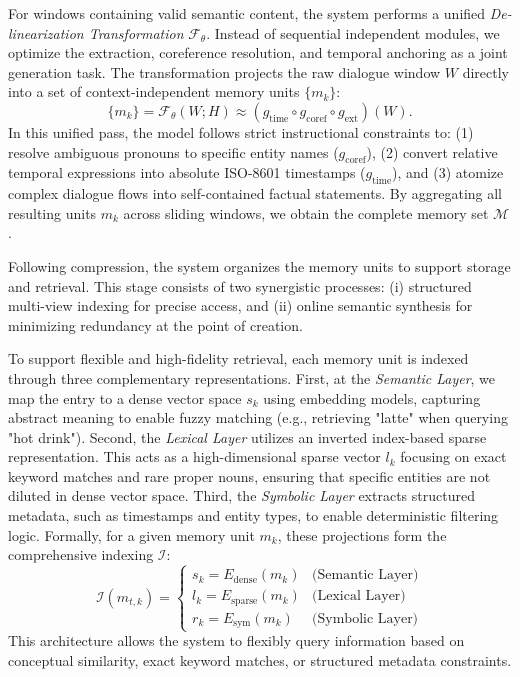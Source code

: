 \documentclass{article}
\theoremstyle{plain}
\theoremstyle{definition}
\theoremstyle{remark}
\begin{document}
For windows containing valid semantic content, the system performs a unified \textit{De-linearization Transformation} $\mathcal{F}_{\theta}$. Instead of sequential independent modules, we optimize the extraction, coreference resolution, and temporal anchoring as a joint generation task. The transformation projects the raw dialogue window $W$ directly into a set of context-independent memory units $\{m_{k}\}$:
\begin{equation}
    \{m_{k}\} = \mathcal{F}_{\theta}(W; H) \approx (g_{\text{time}} \circ g_{\text{coref}} \circ g_{\text{ext}})(W).
\end{equation}
In this unified pass, the model follows strict instructional constraints to: (1) resolve ambiguous pronouns to specific entity names ($g_{\text{coref}}$), (2) convert relative temporal expressions into absolute ISO-8601 timestamps ($g_{\text{time}}$), and (3) atomize complex dialogue flows into self-contained factual statements. By aggregating all resulting units $m_k$ across sliding windows, we obtain the complete memory set $\mathcal{M}$.







Following compression, the system organizes the memory units to support storage and retrieval. This stage consists of two synergistic processes: (i) structured multi-view indexing for precise access, and (ii) online semantic synthesis for minimizing redundancy at the point of creation.

To support flexible and high-fidelity retrieval, each memory unit is indexed through three complementary representations.
First, at the \textit{Semantic Layer}, we map the entry to a dense vector space $s_k$ using embedding models, capturing abstract meaning to enable fuzzy matching (e.g., retrieving "latte" when querying "hot drink").
Second, the \textit{Lexical Layer} utilizes an inverted index-based sparse representation. This acts as a high-dimensional sparse vector $l_k$ focusing on exact keyword matches and rare proper nouns, ensuring that specific entities are not diluted in dense vector space.
Third, the \textit{Symbolic Layer} extracts structured metadata, such as timestamps and entity types, to enable deterministic filtering logic.
Formally, for a given memory unit $m_k$, these projections form the comprehensive indexing $\mathcal{I}$:
\begin{equation}
    \mathcal{I}(m_{t,k}) = \begin{cases} 
    s_{k} = E_{\text{dense}}(m_{k}) & \text{(Semantic Layer)} \\
    l_{k} = E_\text{sparse}(m_{k})  & \text{(Lexical Layer)} \\
    r_{k} = E_\text{sym}(m_{k}) & \text{(Symbolic Layer)}
    \end{cases}
\end{equation}
This architecture allows the system to flexibly query information based on conceptual similarity, exact keyword matches, or structured metadata constraints.
\end{document}
